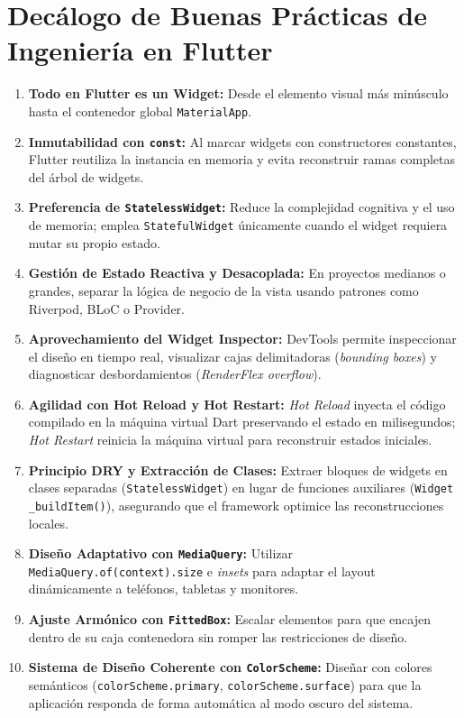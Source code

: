 \documentclass[12pt,a4paper]{article}
\begin{document}
\section{Decálogo de Buenas Prácticas de Ingeniería en Flutter}

\begin{enumerate}[leftmargin=*]
    \item \textbf{Todo en Flutter es un Widget:} Desde el elemento visual más minúsculo hasta el contenedor global \texttt{MaterialApp}.
    \item \textbf{Inmutabilidad con \texttt{const}:} Al marcar widgets con constructores constantes, Flutter reutiliza la instancia en memoria y evita reconstruir ramas completas del árbol de widgets.
    \item \textbf{Preferencia de \texttt{StatelessWidget}:} Reduce la complejidad cognitiva y el uso de memoria; emplea \texttt{StatefulWidget} únicamente cuando el widget requiera mutar su propio estado.
    \item \textbf{Gestión de Estado Reactiva y Desacoplada:} En proyectos medianos o grandes, separar la lógica de negocio de la vista usando patrones como Riverpod, BLoC o Provider.
    \item \textbf{Aprovechamiento del Widget Inspector:} DevTools permite inspeccionar el diseño en tiempo real, visualizar cajas delimitadoras (\textit{bounding boxes}) y diagnosticar desbordamientos (\textit{RenderFlex overflow}).
    \item \textbf{Agilidad con Hot Reload y Hot Restart:} \textit{Hot Reload} inyecta el código compilado en la máquina virtual Dart preservando el estado en milisegundos; \textit{Hot Restart} reinicia la máquina virtual para reconstruir estados iniciales.
    \item \textbf{Principio DRY y Extracción de Clases:} Extraer bloques de widgets en clases separadas (\texttt{StatelessWidget}) en lugar de funciones auxiliares (\texttt{Widget _buildItem()}), asegurando que el framework optimice las reconstrucciones locales.
    \item \textbf{Diseño Adaptativo con \texttt{MediaQuery}:} Utilizar \texttt{MediaQuery.of(context).size} e \textit{insets} para adaptar el layout dinámicamente a teléfonos, tabletas y monitores.
    \item \textbf{Ajuste Armónico con \texttt{FittedBox}:} Escalar elementos para que encajen dentro de su caja contenedora sin romper las restricciones de diseño.
    \item \textbf{Sistema de Diseño Coherente con \texttt{ColorScheme}:} Diseñar con colores semánticos (\texttt{colorScheme.primary}, \texttt{colorScheme.surface}) para que la aplicación responda de forma automática al modo oscuro del sistema.
\end{enumerate}
\end{document}
